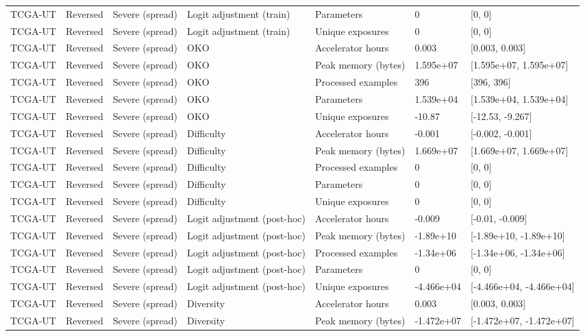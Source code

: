 \begin{longtable}{lllllll}
TCGA-UT & Reversed & Severe (spread) & Logit adjustment (train) & Parameters & 0 & [0, 0] \\
TCGA-UT & Reversed & Severe (spread) & Logit adjustment (train) & Unique exposures & 0 & [0, 0] \\
TCGA-UT & Reversed & Severe (spread) & OKO & Accelerator hours & 0.003 & [0.003, 0.003] \\
TCGA-UT & Reversed & Severe (spread) & OKO & Peak memory (bytes) & 1.595e+07 & [1.595e+07, 1.595e+07] \\
TCGA-UT & Reversed & Severe (spread) & OKO & Processed examples & 396 & [396, 396] \\
TCGA-UT & Reversed & Severe (spread) & OKO & Parameters & 1.539e+04 & [1.539e+04, 1.539e+04] \\
TCGA-UT & Reversed & Severe (spread) & OKO & Unique exposures & -10.87 & [-12.53, -9.267] \\
TCGA-UT & Reversed & Severe (spread) & Difficulty & Accelerator hours & -0.001 & [-0.002, -0.001] \\
TCGA-UT & Reversed & Severe (spread) & Difficulty & Peak memory (bytes) & 1.669e+07 & [1.669e+07, 1.669e+07] \\
TCGA-UT & Reversed & Severe (spread) & Difficulty & Processed examples & 0 & [0, 0] \\
TCGA-UT & Reversed & Severe (spread) & Difficulty & Parameters & 0 & [0, 0] \\
TCGA-UT & Reversed & Severe (spread) & Difficulty & Unique exposures & 0 & [0, 0] \\
TCGA-UT & Reversed & Severe (spread) & Logit adjustment (post-hoc) & Accelerator hours & -0.009 & [-0.01, -0.009] \\
TCGA-UT & Reversed & Severe (spread) & Logit adjustment (post-hoc) & Peak memory (bytes) & -1.89e+10 & [-1.89e+10, -1.89e+10] \\
TCGA-UT & Reversed & Severe (spread) & Logit adjustment (post-hoc) & Processed examples & -1.34e+06 & [-1.34e+06, -1.34e+06] \\
TCGA-UT & Reversed & Severe (spread) & Logit adjustment (post-hoc) & Parameters & 0 & [0, 0] \\
TCGA-UT & Reversed & Severe (spread) & Logit adjustment (post-hoc) & Unique exposures & -4.466e+04 & [-4.466e+04, -4.466e+04] \\
TCGA-UT & Reversed & Severe (spread) & Diversity & Accelerator hours & 0.003 & [0.003, 0.003] \\
TCGA-UT & Reversed & Severe (spread) & Diversity & Peak memory (bytes) & -1.472e+07 & [-1.472e+07, -1.472e+07] \\

\end{longtable}

